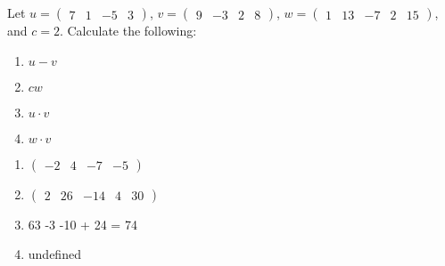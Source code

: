 \documentclass[
]{article}
\begin{document}
\setcounter{section}{6}

\begin{exercise}
\protect\hypertarget{exr:vectors1}{}\label{exr:vectors1}

Let \(u = \begin{pmatrix} 7&1&-5&3\end{pmatrix}\), \(v = \begin{pmatrix} 9&-3&2&8 \end{pmatrix}\), \(w = \begin{pmatrix} 1&13& -7&2 &15 \end{pmatrix}\), and \(c = 2\). Calculate the following:

\begin{enumerate}
\def\labelenumi{\arabic{enumi}.}
\item
  \(u-v\)
\item
  \(cw\)
\item
  \(u \cdot v\)
\item
  \(w \cdot v\)
\end{enumerate}

\end{exercise}

\begin{answer}
\noindent
\begin{enumerate}
\item $\begin{pmatrix} -2 &4&-7&-5 \end{pmatrix}$
\item $\begin{pmatrix} 2 &26&-14&4&30 \end{pmatrix}$
\item 63 -3 -10 + 24 = 74
\item undefined
\end{enumerate}
\end{answer}
\end{document}
